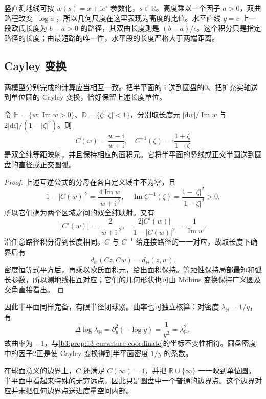 竖直测地线可按 \(w(s)=x+\mathrm i e^s\) 参数化，\(s\in\mathbb R\)。高度乘以一个因子 \(a>0\)，双曲路程改变 \(|\log a|\)，所以几何尺度在这里表现为高度的比值。水平直线 \(y=c\) 上一段欧氏长度为 \(b-a>0\) 的路径，其双曲长度则是 \((b-a)/c\)。这个积分只是指定路径的长度；由最短路的唯一性，水平段的长度严格大于两端距离。

\subsection{Cayley 变换}
\label{b3:subsec:130303}

两模型分别完成的计算应当相互一致。把半平面的 \(\mathrm i\) 送到圆盘的0、把扩充实轴送到单位圆的 Cayley 变换，恰好保留上述长度单位。

\begin{proposition}[Cayley 等距]\label{b3:prop:13-cayley-isometry}
令 \(\mathbb H=\{w:\operatorname{Im}w>0\}\)、\(\mathbb D=\{\zeta:|\zeta|<1\}\)，分别取长度元 \(|\mathrm dw|/\operatorname{Im}w\) 与 \(2|\mathrm d\zeta|/(1-|\zeta|^2)\)。则
\[
 C(w)=\frac{w-\mathrm i}{w+\mathrm i},\quad
 C^{-1}(\zeta)=\mathrm i\frac{1+\zeta}{1-\zeta}
\]
是双全纯等距映射，并且保持相应的面积元。它将半平面的竖线或正交半圆送到圆盘的直径或正交圆弧。
\end{proposition}
\begin{proof}
上述互逆公式的分母在各自定义域中不为零，且
\[
 1-|C(w)|^2=\frac{4\operatorname{Im}w}{|w+\mathrm i|^2},
 \quad
 \operatorname{Im}C^{-1}(\zeta)
 =\frac{1-|\zeta|^2}{|1-\zeta|^2}>0.
\]
所以它们确为两个区域之间的双全纯映射。又有
\[
 |C'(w)|=\frac2{|w+\mathrm i|^2},\quad
 \frac{2|C'(w)|}{1-|C(w)|^2}
 =\frac1{\operatorname{Im}w}.
\]
沿任意路径积分得到长度相同。\(C\) 与 \(C^{-1}\) 给连接路径的一一对应，故取长度下确界后有
\[
 d_{\mathbb D}(Cz,Cw)=d_{\mathbb H}(z,w).
\]
密度恒等式平方后，再乘以欧氏面积元，给出面积保持。等距性保持局部最短和弧长参数，所以测地线相互对应；它们的几何形状也可由 Möbius 变换保持广义圆及交角直接看出。
\end{proof}

因此半平面同样完备，有限半径闭球紧。曲率也可独立核算：对密度 \(\lambda_{\mathbb H}=1/y\)，有
\[
 \Delta\log\lambda_{\mathbb H}
 =\partial_y^2(-\log y)=\frac1{y^2}
 =\lambda_{\mathbb H}^2,
\]
故曲率为 \(-1\)，与\cref{b3:prop:13-curvature-coordinate}的坐标不变性相符。圆盘密度中的因子2正是使 Cayley 变换得到半平面密度 \(1/y\) 的系数。

\ProseParagraphBreak
在球面意义的边界上，\(C\) 还满足 \(C(\infty)=1\)，并把 \(\mathbb R\cup\{\infty\}\) 一一映到单位圆。半平面中看起来特殊的无穷远点，因此只是圆盘中一个普通的边界点。这个边界对应并未把任何边界点送进度量空间内部。

